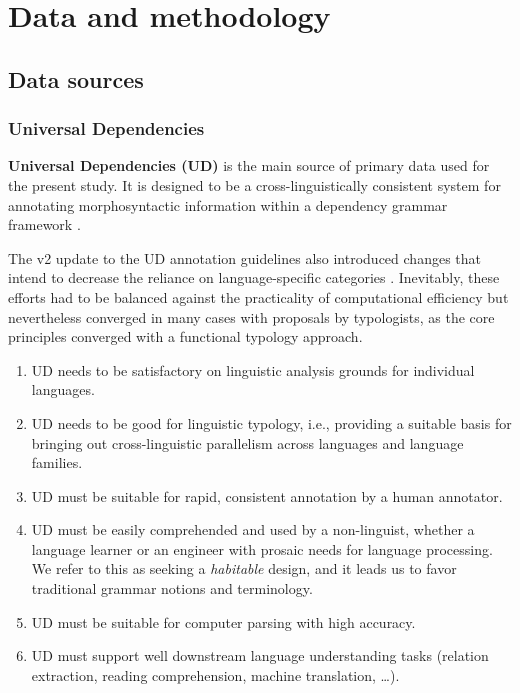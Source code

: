 \chapter{Data and methodology}

\section{Data sources}

\subsection{Universal Dependencies}


\textbf{Universal Dependencies (UD)} is the main source of primary data used for the present study. It is designed to be a cross-linguistically consistent system for annotating morphosyntactic information within a dependency grammar framework \citep{demarneffe2021}. 

The v2 update to the UD annotation guidelines also introduced changes that intend to decrease the reliance on language-specific categories \citep{nivre2020}. Inevitably, these efforts had to be balanced against the practicality of computational efficiency but nevertheless converged in many cases with proposals by typologists, as the core principles converged with a functional typology approach. \citet{croft2017}

\begin{enumerate}
    \item UD needs to be satisfactory on linguistic analysis grounds for individual languages.
    \item UD needs to be good for linguistic typology, i.e., providing a suitable basis for bringing out cross-linguistic parallelism across languages and language families.
    \item UD must be suitable for rapid, consistent annotation by a human annotator.
    \item UD must be easily comprehended and used by a non-linguist, whether a language learner or an engineer with prosaic needs for language processing. We refer to this as seeking a \textit{habitable} design, and it leads us to favor traditional grammar notions and terminology.
    \item UD must be suitable for computer parsing with high accuracy.
    \item UD must support well downstream language understanding tasks (relation extraction, reading comprehension, machine translation, \dots).
\end{enumerate}


